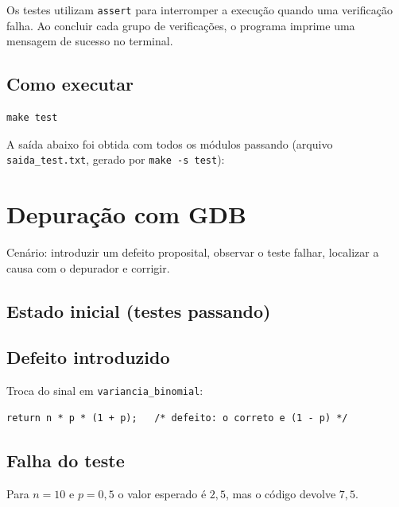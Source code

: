 \documentclass[12pt,a4paper]{article}
\newcommand{\todo}[1]{}
\newcommand{\cod}[1]{\texttt{#1}}
\newcommand{\saida}[1]{}
\begin{document}
Os testes utilizam \cod{assert} para interromper
a execução quando uma verificação falha. Ao concluir
cada grupo de verificações, o programa imprime uma
mensagem de sucesso no terminal.
\subsection{Como executar}
\begin{lstlisting}[style=shell]
make test
\end{lstlisting}
A saída abaixo foi obtida com todos os módulos passando (arquivo \cod{saida\_test.txt}, gerado por \cod{make -s test}):
\saida{saida_test.txt}

\section{Depuração com GDB}

Cenário: introduzir um defeito proposital, observar o teste falhar, localizar a
causa com o depurador e corrigir.

\subsection{Estado inicial (testes passando)}
\todo{saída de \cod{evidencia\_1\_passa.txt}}

\subsection{Defeito introduzido}
Troca do sinal em \cod{variancia\_binomial}:
\begin{lstlisting}
return n * p * (1 + p);   /* defeito: o correto e (1 - p) */
\end{lstlisting}
\todo{diff de \cod{evidencia\_2\_bug.diff}}

\subsection{Falha do teste}
Para $n = 10$ e $p = 0{,}5$ o valor esperado é $2{,}5$, mas o código devolve
$7{,}5$.
\todo{saída de \cod{evidencia\_3\_falha.txt} com função e linha do \cod{assert}}
\end{document}
